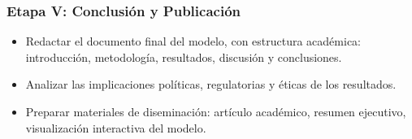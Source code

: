 \documentclass[a4paper,12pt]{article}
\begin{document}
\subsubsection*{Etapa V: Conclusión y Publicación}

\begin{itemize}
    \item Redactar el documento final del modelo, con estructura académica: introducción, metodología, resultados, discusión y conclusiones.
    \item Analizar las implicaciones políticas, regulatorias y éticas de los resultados.
    \item Preparar materiales de diseminación: artículo académico, resumen ejecutivo, visualización interactiva del modelo.
\end{itemize}
\end{document}
